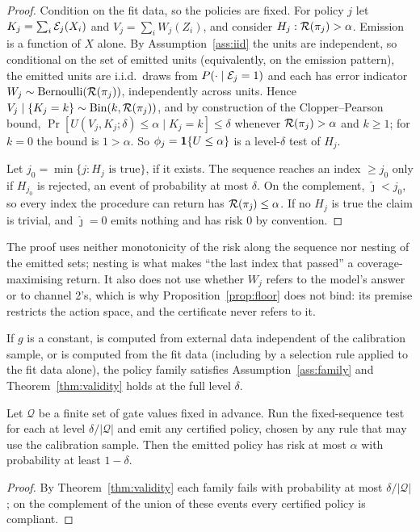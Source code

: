 \begin{proof}
Condition on the fit data, so the policies are fixed. For policy $j$ let $K_j=\sum_i\mathcal{E}_j(X_i)$ and
$V_j=\sum_iW_j(Z_i)$, and consider $H_j:\mathcal{R}(\pi_j)>\alpha$. Emission is a function of $X$ alone.
By Assumption~\ref{ass:iid} the units are independent, so conditional on the set of emitted units
(equivalently, on the emission pattern), the emitted units are i.i.d.\ draws from $P(\cdot\mid\mathcal{E}_j=1)$
and each has error indicator $W_j\sim\mathrm{Bernoulli}(\mathcal{R}(\pi_j))$, independently across units.
Hence $V_j\mid\{K_j=k\}\sim\mathrm{Bin}(k,\mathcal{R}(\pi_j))$, and by construction of the
Clopper--Pearson bound, $\Pr[U(V_j,K_j;\delta)\le\alpha\mid K_j=k]\le\delta$ whenever
$\mathcal{R}(\pi_j)>\alpha$ and $k\ge1$; for $k=0$ the bound is $1>\alpha$. So $\phi_j=\mathbf{1}\{U\le\alpha\}$ is a
level-$\delta$ test of $H_j$.

Let $j_0=\min\{j:H_j\text{ is true}\}$, if it exists. The sequence reaches an index $\ge j_0$ only if $H_{j_0}$
is rejected, an event of probability at most $\delta$. On the complement, $\hat\jmath<j_0$, so every
index the procedure can return has $\mathcal{R}(\pi_{\hat\jmath})\le\alpha$. If no $H_j$ is true the claim is
trivial, and $\hat\jmath=0$ emits nothing and has risk $0$ by convention.
\end{proof}

The proof uses neither monotonicity of the risk along the sequence nor nesting of the emitted sets;
nesting is what makes ``the last index that passed'' a coverage-maximising return. It also does not
use whether $W_j$ refers to the model's answer or to channel 2's, which is why Proposition~\ref{prop:floor}
does not bind: its premise restricts the action space, and the certificate never refers to it.

\begin{corollary}
\label{cor:gate}
If $g$ is a constant, is computed from external data independent of the calibration sample, or is
computed from the fit data (including by a selection rule applied to the fit data alone), the policy
family satisfies Assumption~\ref{ass:family} and Theorem~\ref{thm:validity} holds at the full level
$\delta$.
\end{corollary}

\begin{corollary}
\label{cor:union}
Let $\mathcal Q$ be a finite set of gate values fixed in advance. Run the fixed-sequence test for each at
level $\delta/|\mathcal Q|$ and emit any certified policy, chosen by any rule that may use the calibration
sample. Then the emitted policy has risk at most $\alpha$ with probability at least $1-\delta$.
\end{corollary}
\begin{proof}
By Theorem~\ref{thm:validity} each family fails with probability at most $\delta/|\mathcal Q|$; on the
complement of the union of these events every certified policy is compliant.
\end{proof}


